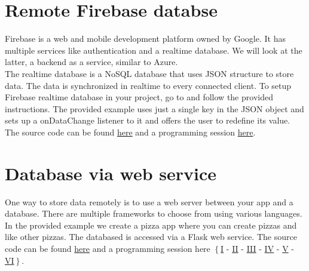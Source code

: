 \section{Remote Firebase databse}
Firebase is a web and mobile development platform owned by Google. It has multiple services like authentication and a realtime database. We will look at the latter, a backend as a service, similar to Azure.\\

The realtime database is a NoSQL database that uses JSON structure to store data. The data is synchronized in realtime to every connected client. To setup Firebase realtime database in your project, go to  and follow the provided instructions. The provided example uses just a single key in the JSON object and sets up a onDataChange listener to it and offers the user to redefine its value. The source code can be found \href{https://github.com/JonSteinn/AndroidDevelopment/tree/master/examples/lab5/firebase}{here} and a programming session \href{https://www.youtube.com/watch?v=TmHsO5nmy7s}{here}.

\section{Database via web service}
One way to store data remotely is to use a web server between your app and a database. There are multiple frameworks to choose from using various languages. In the provided example we create a pizza app where you can create pizzas and like other pizzas. The databased is accessed via a Flask web service. The source code can be found \href{https://github.com/JonSteinn/AndroidDevelopment/tree/master/examples/lab5/webservice}{here} and a programming session here $\left\{\right.$\href{https://youtu.be/CEA9KUqzHGU}{I} - \href{https://youtu.be/QJ47HknYbEs}{II} - \href{https://youtu.be/ytR8qfVj1gU}{III} - \href{https://youtu.be/mjHSuKgRvgE}{IV} - \href{https://youtu.be/2BJmIf9at40}{V} - \href{https://youtu.be/bcOkPMBaU74}{VI}$\left.\right\}$.

